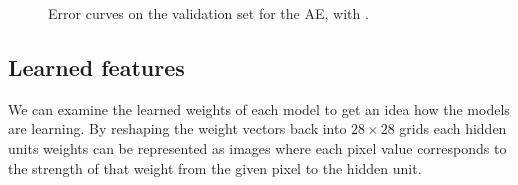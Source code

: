 \documentclass{article}
\begin{document}
\begin{figure}[!ht]
  \centering
  \caption{Error curves on the validation set for the AE, with .}
  \label{fig:aetraining}
\end{figure}

\subsection{Learned features}
We can examine the learned weights of each model to get an idea how the models are learning.
By reshaping the weight vectors back into $28 \times 28$ grids
each hidden units weights can be represented as images
where each pixel value corresponds to the strength of that weight from the given pixel to the hidden unit.
\end{document}
